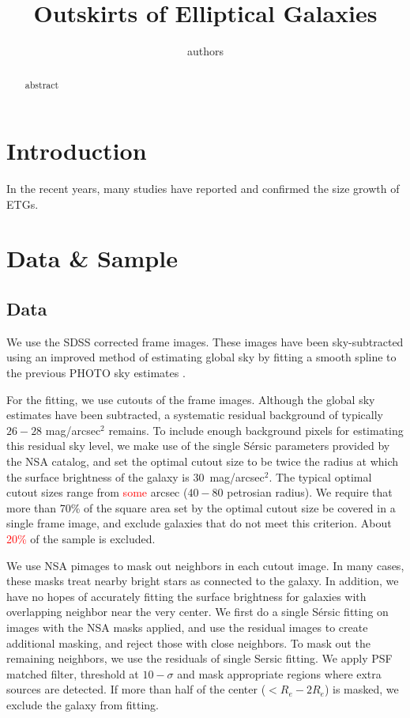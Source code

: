 \documentclass[iop]{emulateapj}
\newcommand{\Sersic}{S\'ersic}
\renewcommand{\Re}{\ensuremath{R_e}}
\newcommand\todo[1]{\textcolor{red}{#1}}
\begin{document}
\title{Outskirts of Elliptical Galaxies}
\author{authors}


\begin{abstract}
    abstract    
\end{abstract}    


\section{Introduction}

In the recent years, many studies have reported and confirmed the size growth
of ETGs.

\section{Data \& Sample}

\subsection{Data}
We use the SDSS corrected frame images. These images have been
sky-subtracted using an improved method of estimating global sky by fitting
a smooth spline to the previous PHOTO sky estimates
\citep[see][for details]{Blanton:2011aa}.

For the fitting, we use cutouts of the frame images.
Although the global sky estimates have been subtracted, a systematic residual
background of typically $26-28$ mag/arcsec$^2$ remains.
To include enough background pixels for estimating this residual sky level,
we make use of the single \Sersic{} parameters provided by the NSA catalog,
and set the optimal cutout size to be twice the radius at which the surface
brightness of the galaxy is 30~mag/arcsec$^2$.
The typical optimal cutout sizes range from
\todo{some} arcsec ($40-80$ petrosian radius).
We require that more than 70\% of the square area set by the optimal cutout
size be covered in a single frame image,
and exclude galaxies that do not meet this criterion.
About \todo{20\%} of the sample is excluded.

We use NSA pimages to mask out neighbors in each cutout image.
In many cases, these masks treat nearby bright stars as connected to the galaxy.
In addition, we have no hopes of accurately fitting the surface brightness
for galaxies with overlapping neighbor near the very center.
We first do a single \Sersic{} fitting on images with the NSA masks applied,
and use the residual images to create additional masking,
and reject those with close neighbors.
To mask out the remaining neighbors, we use the residuals of single Sersic
fitting.
We apply PSF matched filter, threshold at $10-\sigma$ and mask appropriate
regions where extra sources are detected.
If more than half of the center ($< \Re - 2\Re$) is masked, we exclude
the galaxy from fitting.
\end{document}
